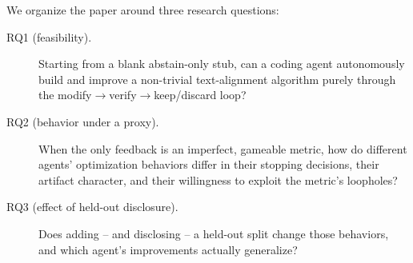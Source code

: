 \documentclass[runningheads]{llncs}
\begin{document}
We organize the paper around three research questions:
\begin{description}
\item[RQ1 (feasibility).] Starting from a blank abstain-only stub, can a
  coding agent autonomously build and improve a non-trivial text-alignment
  algorithm purely through the modify$\to$verify$\to$keep/discard loop?
\item[RQ2 (behavior under a proxy).] When the only feedback is an imperfect,
  gameable metric, how do different agents' optimization behaviors differ in
  their stopping decisions, their artifact character, and their willingness
  to exploit the metric's loopholes?
\item[RQ3 (effect of held-out disclosure).] Does adding -- and disclosing --
  a held-out split change those behaviors, and which agent's improvements
  actually generalize?
\end{description}
\end{document}
